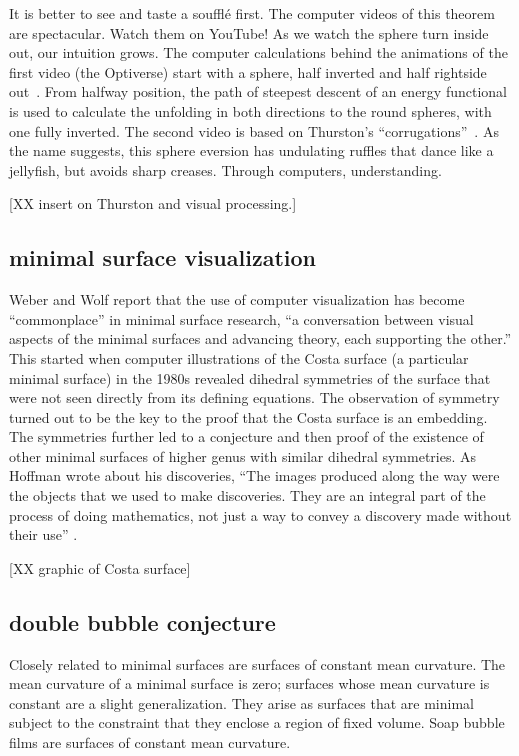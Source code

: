 \documentclass{llncs}
\begin{document}
It is better to see and taste a souffl\'e first.  The computer videos
of this theorem are spectacular.  Watch them on YouTube!  As we watch
the sphere turn inside out, our intuition grows.  The computer
calculations behind the animations of the first video (the Optiverse)
start with a sphere, half inverted and half rightside out~\cite{SFL}.  From
halfway position, the path of steepest descent of an energy functional is
used to calculate the unfolding in both directions to the round spheres,
with one fully inverted.  The second video is based on Thurston's
``corrugations''~\cite{LMM}. As the name suggests, this sphere eversion has
undulating ruffles that dance like a jellyfish, but avoids sharp
creases.   Through computers, understanding.

[XX insert on Thurston and visual processing.]

\subsection{minimal surface visualization} %

Weber and Wolf \cite{WW11} report that the use of computer
visualization has become ``commonplace'' in minimal surface research,
``a conversation between visual aspects of the minimal surfaces and
advancing theory, each supporting the other.''  This started when
computer illustrations of the Costa surface (a particular minimal
surface) in the 1980s revealed dihedral symmetries of the surface that
were not seen directly from its defining equations.  The observation
of symmetry turned out to be the key to the proof that the Costa
surface is an embedding.  The symmetries further led to a conjecture
and then proof of the existence of other minimal surfaces of higher
genus with similar dihedral symmetries.  As Hoffman wrote about his discoveries, ``The
images produced along the way were the objects that we used to make
discoveries. They are an integral part of the process of doing
mathematics, not just a way to convey a discovery made without their
use'' \cite{Hoffman}.

[XX graphic of Costa surface]


\subsection{double bubble conjecture}

Closely related to minimal surfaces are surfaces of constant mean
curvature.  The mean curvature of a minimal surface is zero; surfaces
whose mean curvature is constant are a slight generalization.  They
arise as surfaces that are minimal subject to the constraint that
they enclose a region of fixed volume.  Soap bubble films are
surfaces of constant mean curvature.  
\end{document}

